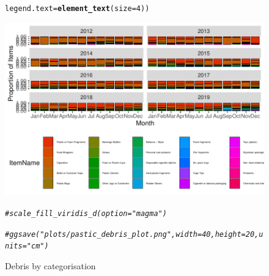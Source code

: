 \documentclass[10pt]{article}\usepackage[]{graphicx}\usepackage[]{color}
\makeatletter
\newcommand{\hlnum}[1]{\textcolor[rgb]{0.686,0.059,0.569}{#1}}%
\newcommand{\hlcom}[1]{\textcolor[rgb]{0.678,0.584,0.686}{\textit{#1}}}%
\newcommand{\hlstd}[1]{\textcolor[rgb]{0.345,0.345,0.345}{#1}}%
\newcommand{\hlkwc}[1]{\textcolor[rgb]{0.333,0.667,0.333}{#1}}%
\newcommand{\hlkwd}[1]{\textcolor[rgb]{0.737,0.353,0.396}{\textbf{#1}}}%
\newenvironment{kframe}{%
 \def\at@end@of@kframe{}%
 \ifinner\ifhmode%
  \def\at@end@of@kframe{\end{minipage}}%
  \begin{minipage}{\columnwidth}%
 \fi\fi%
 \def\FrameCommand##1{\hskip\@totalleftmargin \hskip-\fboxsep
 \colorbox{shadecolor}{##1}\hskip-\fboxsep
     \hskip-\linewidth \hskip-\@totalleftmargin \hskip\columnwidth}%
 \MakeFramed {\advance\hsize-\width
   \@totalleftmargin\z@ \linewidth\hsize
   \@setminipage}}%
 {\par\unskip\endMakeFramed%
 \at@end@of@kframe}
\newenvironment{knitrout}{}{} %
\makeatother
\begin{document}
\begin{figure}[H]
\begin{center}
\begin{knitrout}
\begin{kframe}
\begin{alltt}
          \hlkwc{legend.text}\hlstd{=}\hlkwd{element_text}\hlstd{(}\hlkwc{size}\hlstd{=}\hlnum{4}\hlstd{))}
\end{alltt}
\end{kframe}
\includegraphics[width=1\linewidth]{figure/unnamed-chunk-9-1} 
\begin{kframe}\begin{alltt}
    \hlcom{#scale_fill_viridis_d(option = "magma")}

\hlcom{#ggsave("plots/pastic_debris_plot.png", width = 40, height = 20, units = "cm")}
\end{alltt}
\end{kframe}
\end{knitrout}
\caption {Debris by categorisation}
\label{figE}
\end {center}
\end {figure}
\end{document}
